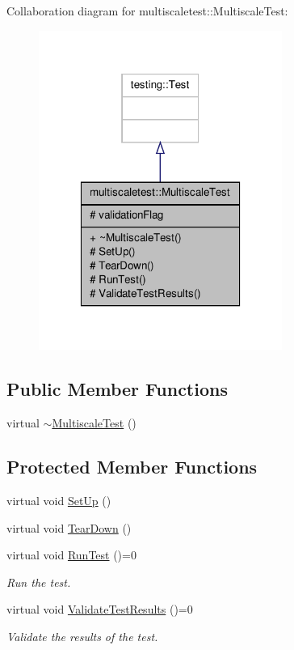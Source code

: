 Collaboration diagram for multiscaletest\-:\-:Multiscale\-Test\-:
\nopagebreak
\begin{figure}[H]
\begin{center}
\leavevmode
\includegraphics[width=226pt]{classmultiscaletest_1_1MultiscaleTest__coll__graph}
\end{center}
\end{figure}
\subsection*{Public Member Functions}
\begin{DoxyCompactItemize}
\item 
virtual \hyperlink{classmultiscaletest_1_1MultiscaleTest_a27aa0fd218670e2265edad84b2fb1f8f}{$\sim$\-Multiscale\-Test} ()
\end{DoxyCompactItemize}
\subsection*{Protected Member Functions}
\begin{DoxyCompactItemize}
\item 
virtual void \hyperlink{classmultiscaletest_1_1MultiscaleTest_ae2aca36167fd45b7ad41a62959fa2d7b}{Set\-Up} ()
\item 
virtual void \hyperlink{classmultiscaletest_1_1MultiscaleTest_a189153640670abf1819ae8d71899aa94}{Tear\-Down} ()
\item 
virtual void \hyperlink{classmultiscaletest_1_1MultiscaleTest_a3b3c62b74e1fd1eb0633f9b720659ce3}{Run\-Test} ()=0
\begin{DoxyCompactList}\small\item\em Run the test. \end{DoxyCompactList}\item 
virtual void \hyperlink{classmultiscaletest_1_1MultiscaleTest_a571838b9aa291a62da67733e39268871}{Validate\-Test\-Results} ()=0
\begin{DoxyCompactList}\small\item\em Validate the results of the test. \end{DoxyCompactList}\end{DoxyCompactItemize}
